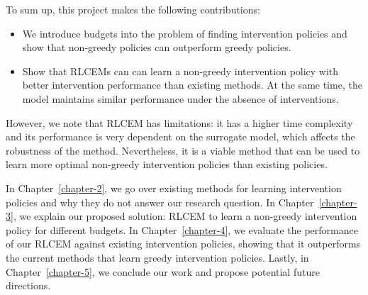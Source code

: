 To sum up, this project makes the following contributions:
\begin{itemize}
    \item We introduce budgets into the problem
    of finding intervention policies and show that non-greedy policies can outperform greedy policies.
    \item Show that RLCEMs can
    can learn a non-greedy intervention policy
    with better intervention performance than existing methods. At the same time, the model maintains similar performance under 
the absence of interventions. 
\end{itemize}

However, we note that
RLCEM has limitations: it has a 
higher time complexity and its performance is very dependent on the surrogate model, which 
affects the robustness of the method. Nevertheless, it is a viable method that can be used to learn more optimal non-greedy intervention policies than existing policies.

In Chapter~\ref{chapter-2}, we go over existing methods for learning 
intervention policies and why they do not answer our research question. In Chapter~\ref{chapter-3}, we explain our proposed solution: RLCEM to learn a non-greedy intervention policy for different budgets.
In Chapter~\ref{chapter-4}, we evaluate the performance of our RLCEM against existing intervention policies, showing that it outperforms the current methods that learn greedy intervention policies.
Lastly, in Chapter~\ref{chapter-5}, we conclude our work and propose potential future directions.



